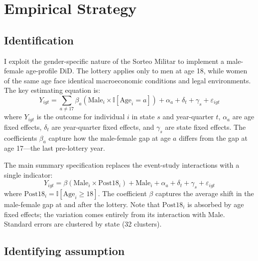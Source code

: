 \documentclass[12pt]{article}
\newcommand{\ind}{\mathbb{I}}
\begin{document}


\section{Empirical Strategy}

\subsection{Identification}

I exploit the gender-specific nature of the Sorteo Militar to implement a male-female age-profile DiD. The lottery applies only to men at age 18, while women of the same age face identical macroeconomic conditions and legal environments. The key estimating equation is:
\begin{equation}
Y_{igt} = \sum_{a \neq 17} \beta_a \left( \text{Male}_i \times \ind[\text{Age}_i = a] \right) + \alpha_a + \delta_t + \gamma_s + \varepsilon_{igt}
\label{eq:eventstudy}
\end{equation}
where $Y_{igt}$ is the outcome for individual $i$ in state $s$ and year-quarter $t$, $\alpha_a$ are age fixed effects, $\delta_t$ are year-quarter fixed effects, and $\gamma_s$ are state fixed effects. The coefficients $\beta_a$ capture how the male-female gap at age $a$ differs from the gap at age 17---the last pre-lottery year.

The main summary specification replaces the event-study interactions with a single indicator:
\begin{equation}
Y_{igt} = \beta \left( \text{Male}_i \times \text{Post18}_i \right) + \text{Male}_i + \alpha_a + \delta_t + \gamma_s + \varepsilon_{igt}
\label{eq:did}
\end{equation}
where $\text{Post18}_i = \ind[\text{Age}_i \geq 18]$. The coefficient $\beta$ captures the average shift in the male-female gap at and after the lottery. Note that $\text{Post18}_i$ is absorbed by age fixed effects; the variation comes entirely from its interaction with Male. Standard errors are clustered by state (32 clusters).

\subsection{Identifying assumption}
\end{document}
